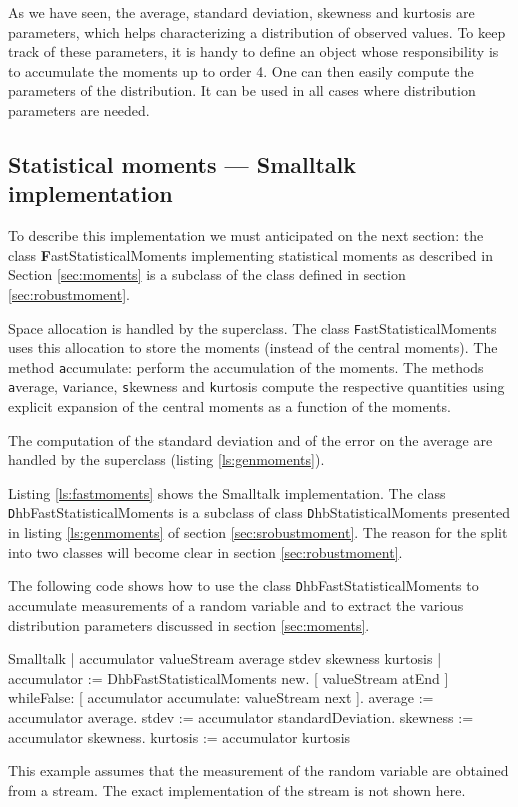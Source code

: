 As we have seen, the average, standard deviation, skewness and
kurtosis are parameters, which helps characterizing a distribution
of observed values. To keep track of these parameters, it is handy
to define an object whose responsibility is to accumulate the
moments up to order 4. One can then easily compute the parameters
of the distribution. It can be used in all cases where
distribution parameters are needed.

\subsection{Statistical moments --- Smalltalk implementation}
 To describe this implementation
we must anticipated on the next section: the class {\textbf
FastStatisticalMoments} implementing statistical moments as
described in Section \ref{sec:moments} is a subclass of the class
defined in section \ref{sec:robustmoment}.

Space allocation is handled by the superclass. The class {\texttt
FastStatisticalMoments} uses this allocation to store the moments
(instead of the central moments). The method {\texttt accumulate:}
perform the accumulation of the moments. The methods {\texttt
average}, {\texttt variance}, {\texttt skewness} and {\texttt kurtosis}
compute the respective quantities using explicit expansion of the
central moments as a function of the moments.

The computation of the standard deviation and of the error on the
average are handled by the superclass (\cf listing
\ref{ls:genmoments}).

\label{sec:smoments}Listing \ref{ls:fastmoments} shows the
Smalltalk implementation. The class {\texttt
DhbFastStatisticalMoments} is a subclass of class {\texttt
DhbStatisticalMoments} presented in listing \ref{ls:genmoments} of
section \ref{sec:srobustmoment}. The reason for the split into two
classes will become clear in section \ref{sec:robustmoment}.

The following code shows how to use the class {\texttt
DhbFastStatisticalMoments} to accumulate measurements of a random
variable and to extract the various distribution parameters
discussed in section \ref{sec:moments}.
\begin{displaycode}{Smalltalk}
 | accumulator valueStream average stdev skewness kurtosis |
 accumulator := DhbFastStatisticalMoments new.
 [ valueStream atEnd ]
        whileFalse: [ accumulator accumulate: valueStream next ].
 average := accumulator average.
 stdev := accumulator standardDeviation.
 skewness := accumulator skewness.
 kurtosis := accumulator kurtosis
\end{displaycode}
This example assumes that the measurement of the random variable
are obtained from a stream. The exact implementation of the stream
is not shown here.

